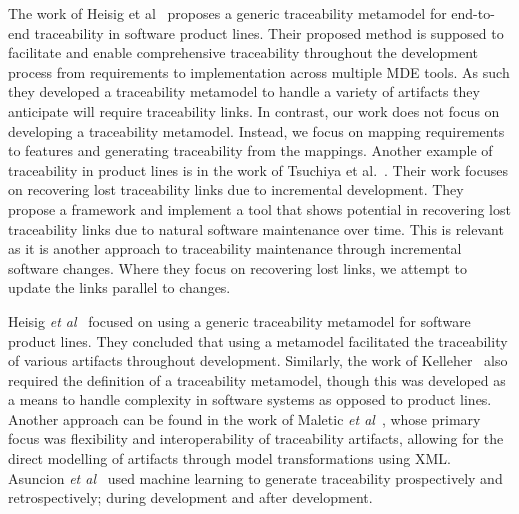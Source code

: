 The work of Heisig et al~\cite{heisig2019generic} proposes a generic traceability metamodel for end-to-end traceability in software product lines. Their proposed method is supposed to facilitate and enable comprehensive traceability throughout the development process from requirements to implementation across multiple MDE tools. As such they developed a traceability metamodel to handle a variety of artifacts they anticipate will require traceability links. In contrast, our work does not focus on developing a traceability metamodel. Instead, we focus on mapping requirements to features and generating traceability from the mappings. Another example of traceability in product lines is in the work of Tsuchiya et al.~\cite{tsuchiya2013recovering}. Their work focuses on recovering lost traceability links due to incremental development. They propose a framework and implement a tool that shows potential in recovering lost traceability links due to natural software maintenance over time. This is relevant as it is another approach to traceability maintenance through incremental software changes. Where they focus on recovering lost links, we attempt to update the links parallel to changes.

Heisig \textit{\textit{et al}}~\cite{heisig2019generic} focused on using a generic traceability metamodel for software product lines. They concluded that using a metamodel facilitated the traceability of various artifacts throughout development. Similarly, the work of Kelleher~\cite{kelleher2005reusable} also required the definition of a traceability metamodel, though this was developed as a means to handle complexity in software systems as opposed to product lines. Another approach can be found in the work of Maletic \textit{\textit{et al}}~\cite{maletic2005xml}, whose primary focus was flexibility and interoperability of traceability artifacts, allowing for the direct modelling of artifacts through model transformations using XML. Asuncion \textit{\textit{et al}}~\cite{asuncion2010software} used machine learning to generate traceability prospectively and retrospectively; during development and after development.

%
%

